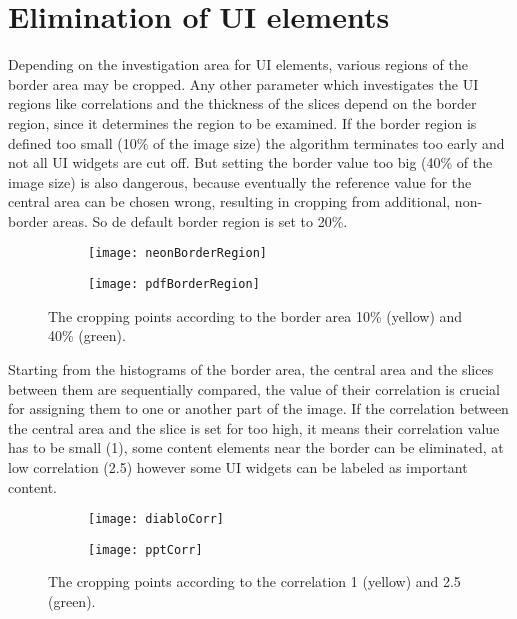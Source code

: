 \documentclass[draft,final]{vutinfth} %
\begin{document}
	\section{Elimination of UI elements} 
	Depending on the investigation area for UI elements, various regions of the border area may be cropped. 
	Any other parameter which investigates the UI regions like correlations and the thickness of the slices depend on the border region, since it determines the region to be examined. 
	If the border region is defined too small (10\% of the image size) the algorithm terminates too early and not all UI widgets are cut off.
	But setting the border value too big (40\% of the image size) is also dangerous, because eventually the reference value for the central area can be chosen wrong, resulting in cropping from additional, non-border areas.
	So de default border region is set to 20\%.\par
	\begin{figure}[H]
		\centering
		\begin{subfigure}[b]{0.45\columnwidth}
			\centering
			\texttt{[image: neonBorderRegion]}
			\label{fig:res:neon}
		\end{subfigure}
		\begin{subfigure}[b]{0.45\columnwidth}
			\centering
			\texttt{[image: pdfBorderRegion]}
			\label{fig:res:pdf}
		\end{subfigure}
		\caption{The cropping points according to the border area 10\% (yellow) and 40\% (green).}
	\end{figure} 
	Starting from the histograms of the border area, the central area and the slices between them are sequentially compared, the value of their correlation is crucial for assigning them to one or another part of the image.
	If the correlation between the central area and the slice is set for too high, it means their correlation value has to be small (1), some content elements near the border can be eliminated, at low correlation (2.5) however some UI widgets can be labeled as important content. \par
	\begin{figure}[H]
		\centering
		\begin{subfigure}[b]{0.45\columnwidth}
			\centering
			\texttt{[image: diabloCorr]}
			\label{fig:res:corr1}
		\end{subfigure}
		\begin{subfigure}[b]{0.45\columnwidth}
			\centering
			\texttt{[image: pptCorr]}
			\label{fig:res:corr2}
		\end{subfigure}
		\caption{The cropping points according to the correlation 1 (yellow) and 2.5 (green).}
	\end{figure} 
\end{document}
